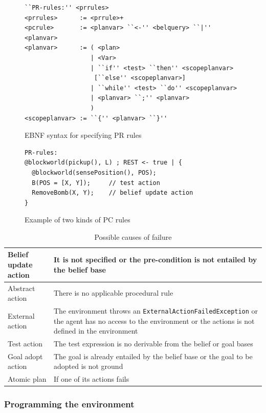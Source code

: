 \documentclass[a4paper]{article}
\begin{document}
\begin{figure}[htp]
\begin{verbatim}
``PR-rules:'' <prrules>
<prrules>      := <prrule>+
<pcrule>       := <planvar> ``<-'' <belquery> ``|'' <planvar>
<planvar>      := ( <plan>
                  | <Var>
                  | ``if'' <test> ``then'' <scopeplanvar>
                   [``else'' <scopeplanvar>]
                  | ``while'' <test> ``do'' <scopeplanvar> 
                  | <planvar> ``;'' <planvar>
                  )
<scopeplanvar> := ``{'' <planvar> ``}''
\end{verbatim}
\caption{EBNF syntax for specifying PR rules}
\label{fig:ebnf_prrules}
\end{figure}

\begin{figure}[htp]
\begin{verbatim}
PR-rules:
@blockworld(pickup(), L) ; REST <- true | { 
  @blockworld(sensePosition(), POS);
  B(POS = [X, Y]);     // test action	
  RemoveBomb(X, Y);    // belief update action
}
\end{verbatim}
\caption{Example of two kinds of PC rules}
\label{fig:example_pcrules}
\end{figure}

\begin{table}[htp]
  \begin{tabular}{|l| p{8.5cm}|}
  \hline
  Belief update action & It is not specified or the pre-condition is not entailed by the belief base  \\
  \hline
  Abstract action & There is no applicable procedural rule \\
  \hline
  External action & The environment throws an \texttt{ExternalActionFailedException} or the agent has no access to the environment or the actions is not defined in the environment \\
  \hline
  Test action & The test expression is no derivable from the belief or goal bases \\
  \hline
  Goal adopt action & The goal is already entailed by the belief base or the goal to be adopted is not ground\\
  \hline
  Atomic plan & If one of its actions fails \\
  \hline
  \end{tabular}
  \caption{Possible causes of failure}
  \label{table:action_fail}
\end{table}

\subsubsection{Programming the environment} %
\end{document}
